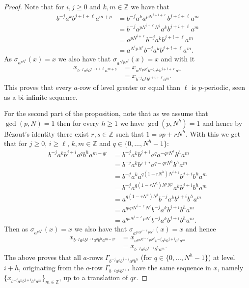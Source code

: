 \documentclass[letterpaper,10pt]{article}
\theoremstyle{plain}
\begin{document}
	\begin{proof}
		Note that for $i,j\ge 0$ and $k,m\in \mathbb{Z}$ we have that
		\begin{align*}
		b^{-j}a^kb^{j+i+\ell}a^{m+p}&=b^{-j}a^ka^{pN^{j+i+\ell}}b^{j+i+\ell}a^{m}\\
		&=b^{-j}a^{pN^{i+\ell}N^j}a^{k}b^{j+i+\ell}a^{m}\\
		&=a^{pN^{i+\ell}}b^{-j}a^{k}b^{j+i+\ell}a^{m}\\
		&=a^{N^{i}pN^{\ell}}b^{-j}a^{k}b^{j+i+\ell}a^{m}.
		\end{align*}
		As $\sigma_{a^{pN^{\ell}}}(x)=x$ we also have that $\sigma_{a^{N^{i}pN^{\ell}}}(x)=x$ and with it
		\begin{align*}
		x_{b^{-j}a^kb^{j+i+\ell}a^{m+p}}&=x_{a^{N^{i}pN^{\ell}}b^{-j}a^{k}b^{j+i+\ell}a^{m}}\\
		&=x_{b^{-j}a^{k}b^{j+i+\ell}a^{m}}.
		\end{align*}
		This proves that every $a$-row of level greater or equal than $\ell$ is $p$-periodic, seen as a bi-infinite sequence.
		
		For the second part of the proposition, note that as we assume that $\gcd(p,N)=1$ then for every $h\ge 1$ we have $\gcd(p,N^h)=1$ and hence by Bézout's identity there exist $r,s\in \mathbb{Z}$ such that $1=sp+rN^h$. With this we get that for $j\ge 0$, $i\ge \ell$, $k,m\in \mathbb{Z}$ and $q\in \{0,\ldots,N^h-1\}$:
		\begin{align*}
		b^{-j}a^{k}b^{j+i}a^{q}b^{h}a^{m-qr}&=b^{-j}a^{k}b^{j+i}a^{q}a^{-qrN^h}b^{h}a^{m}\\
		&=b^{-j}a^{k}b^{j+i}a^{q-qrN^h}b^{h}a^{m}\\
		&=b^{-j}a^{k}a^{q(1-rN^{h})N^{i+j}}b^{j+i}b^{h}a^{m}\\
		&=b^{-j}a^{q(1-rN^{h})N^{i}N^{j}}a^{k}b^{j+i}b^{h}a^{m}\\	
		&=a^{q(1-rN^{h})N^{i}}b^{-j}a^{k}b^{j+i}b^{h}a^{m}\\
		&=a^{qspN^{i-\ell}N^{\ell}}b^{-j}a^{k}b^{j+i}b^{h}a^{m}\\
		&=a^{qsN^{i-\ell}pN^{\ell}}b^{-j}a^{k}b^{j+i}b^{h}a^{m}.				
		\end{align*}
		Then as $\sigma_{a^{pN^\ell}}(x)=x$ we also have that $\sigma_{a^{qsN^{i-\ell}pN^{\ell}}}(x)=x$ and hence
		\begin{align*}
		x_{b^{-j}a^{k}b^{j+i}a^{q}b^{h}a^{m-qr}}&=x_{a^{qsN^{i-\ell}pN^{\ell}}b^{-j}a^{k}b^{j+i}b^{h}a^{m}}\\
		&=x_{b^{-j}a^{k}b^{j+i}b^{h}a^{m}}.
		\end{align*}
		The above proves that all $a$-rows $\Gamma_{b^{-j}a^kb^{j+i}a^qb^h}$ (for $q\in \{0,\ldots,N^h-1\}$) at level $i+h$, originating from the $a$-row $\Gamma_{b^{-j}a^kb^{j+i}}$ have the same sequence in $x$, namely $\{x_{b^{-j}a^{k}b^{j+i}b^{h}a^{m}}\}_{m\in \mathbb{Z}}$, up to a translation of $qr$.
	\end{proof}
	
\end{document}
